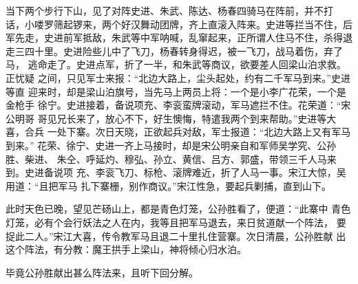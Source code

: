 当下两个步行下山，见了对阵史进、朱武、陈达、杨春四骑马在阵前，并不打
话，小喽罗筛起锣来，两个好汉舞动团牌，齐上直滚入阵来。史进等拦当不住，后
军先走，史进前军抵敌，朱武等中军呐喊，乱窜起来，正所谓人住马不住，杀得退
走三四十里。史进险些儿中了飞刀，杨春转身得迟，被一飞刀，战马着伤，弃了马，
逃命走了。史进点军，折了一半，和朱武等商议，欲要差人回梁山泊求救。正忧疑
之间，只见军士来报：“北边大路上，尘头起处，约有二千军马到来。”史进等直
迎来时，却是梁山泊旗号，当先马上两员上将：一个是小李广花荣，一个是金枪手
徐宁。史进接着，备说项充、李衮蛮牌滚动，军马遮拦不住。花荣道：“宋公明哥
哥见兄长来了，放心不下，好生懊悔，特遣我两个到来帮助。”史进等大喜，合兵
一处下寨。次日天晓，正欲起兵对敌，军士报道：“北边大路上又有军马到来。”
花荣、徐宁、史进一齐上马接时，却是宋公明亲自和军师吴学究、公孙胜、柴进、
朱仝、呼延灼、穆弘、孙立、黄信、吕方、郭盛，带领三千人马来到。史进备说项
充、李衮飞刀、标枪、滚牌难近，折了人马一事。宋江大惊，吴用道：“且把军马
扎下寨栅，别作商议。”宋江性急，要起兵剿捕，直到山下。

此时天色已晚，望见芒砀山上，都是青色灯笼，公孙胜看了，便道：“此寨中
青色灯笼，必有个会行妖法之人在内，我等且把军马退去，来日贫道献一个阵法，
要捉此二人。”宋江大喜，传令教军马且退二十里扎住营寨。次日清晨，公孙胜献
出这个阵法，有分教：魔王拱手上梁山，神将倾心归水泊。

毕竟公孙胜献出甚么阵法来，且听下回分解。